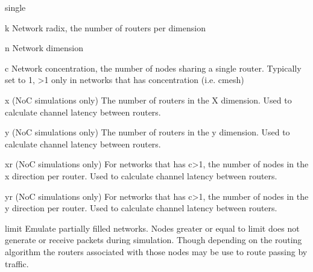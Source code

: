 \documentclass[11pt]{article}
\begin{document}
\begin{opt_list}{single}
\item[k] Network radix, the number of routers per dimension
\item[n] Network dimension
\item[c] Network concentration, the number of nodes sharing a single router. Typically set to 1, >1 only in networks that has concentration (i.e. cmesh)
\item[x] (NoC simulations only) The number of routers in the X dimension. Used to calculate channel latency between routers. 
\item[y] (NoC simulations only) The number of routers in the y dimension. Used to calculate channel latency between routers. 
\item[xr] (NoC simulations only) For networks that has c>1, the number of nodes in the x direction per router. Used to calculate channel latency between routers. 
\item[yr] (NoC simulations only) For networks that has c>1, the number of nodes in the y direction per router. Used to calculate channel latency between routers. 
\item[limit] Emulate partially filled networks. Nodes greater or equal to limit does not generate or receive packets during simulation. Though depending on the routing algorithm the routers associated with those nodes may be use to route passing by traffic. 

\end{opt_list}
\end{document}
